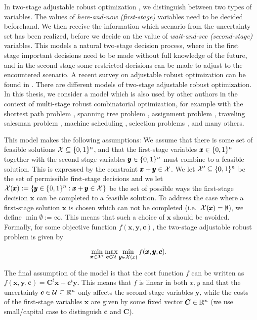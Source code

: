 In two-stage adjustable robust optimization \cite{ben2004adjustable}, we distinguish between two types of variables. The values of \emph{here-and-now (first-stage)} variables need to be decided beforehand. We then receive the information which scenario from the uncertainty set has been realized, before we decide on the value of \emph{wait-and-see (second-stage)} variables. 
This models a natural two-stage decision process, where in the first stage important decisions need to be made without full knowledge of the future, and in the second stage some restricted decisions can be made to adjust to the encountered scenario.
 A recent survey on adjustable robust optimization can be found in \cite{yanikouglu2019survey}.
There are different models of two-stage adjustable robust optimization. In this thesis, we consider a model which is also used by other authors in the context of multi-stage robust combinatorial optimization, for example with the shortest path problem \cite{busing2012paths}, spanning tree problem \cite{hradovich2017recoverable}, assignment problem \cite{fischer2020investigation}, traveling salesman problem \cite{goerigk2021recoverable},
machine scheduling \cite{bold2022investigating,bold2022algorithmic}, selection problems \cite{goerigk2023optimal,goerigk2022two,kasperski2015robust}, and many others. 

This model makes the following assumptions: We assume that there is some set of feasible solutions $\mathcal{X} \subseteq \{ 0,1 \}^n$, and that the first-stage variables $\pmb x \in \{ 0,1 \}^n$ together with the second-stage variables $\pmb y \in \{ 0,1 \}^n$ must combine to a feasible solution. This is expressed by the constraint $\pmb x + \pmb y \in \mathcal{X}$. 
We let $\mathcal{X}' \subseteq \{ 0,1 \}^n$ be the set of permissible first-stage decisions and we let $\mathcal{X}(\pmb x) := \{ \pmb y \in \{ 0,1 \}^n : \pmb x + \pmb y \in \mathcal{X} \}$ be the set of possible ways the first-stage decision $\pmb x$ can be completed to a feasible solution. 
To address the case where a first-stage solution $\pmb x$ is chosen which can not be completed (i.e.\ $\mathcal{X}(\pmb x) = \emptyset$), we define $\min \emptyset := \infty$. This means that such a choice of $\pmb x$ should be avoided. Formally, for some objective function $f(\pmb x,\pmb y,\pmb c)$, the two-stage adjustable robust problem is given by

\[\min_{\pmb x \in \mathcal{X}'} \max_{\pmb c \in \mathcal{U}} \min_{\pmb y \in \mathcal{X}(x)} f(\pmb x,\pmb y,\pmb c).\]

The final assumption of the model is that the cost function $f$ can be written as  $f(\pmb x,\pmb y,\pmb c) = \pmb C^t \pmb x + \pmb c^t \pmb y$. This means that $f$ is linear in both $x,y$ and that the uncertainty $\pmb c \in \mathcal{U} \subseteq \mathbb{R}^n$ only affects the second-stage variables $\pmb y$, while the costs of the first-stage variables $\pmb x$ are given by some fixed vector $\pmb C \in \mathbb{R}^n$ (we use small/capital case to distinguish $\pmb c$ and $\pmb C$). 

